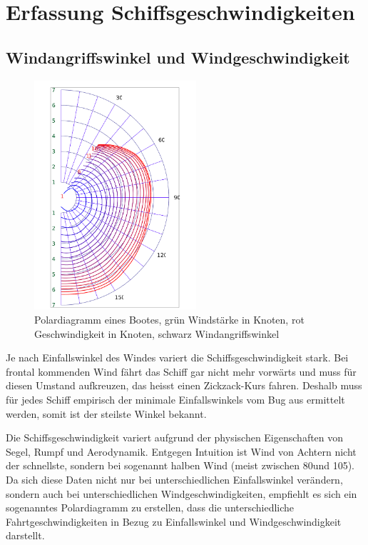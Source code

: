
\section{Erfassung Schiffsgeschwindigkeiten}

\subsection{Windangriffswinkel und Windgeschwindigkeit}

\begin{figure} 
\centering
\includegraphics[width=6cm]{img/polardiagramm}
\caption{Polardiagramm eines Bootes, grün Windstärke in Knoten, rot
Geschwindigkeit in Knoten, schwarz Windangriffswinkel}
\label{polardiagram}
\end{figure}

Je nach Einfallswinkel des Windes variert die Schiffsgeschwindigkeit
stark. Bei frontal kommenden Wind fährt das Schiff gar nicht mehr
vorwärts und muss für diesen Umstand aufkreuzen, das heisst einen
Zickzack-Kurs fahren. Deshalb muss für jedes Schiff empirisch der
minimale Einfallswinkels vom Bug aus ermittelt werden, somit ist der
steilste Winkel bekannt.

Die Schiffsgeschwindigkeit variert aufgrund der physischen Eigenschaften
von Segel, Rumpf und Aerodynamik. Entgegen Intuition ist Wind von
Achtern nicht der schnellste, sondern bei sogenannt halben Wind (meist
zwischen 80\degree und 105\degree). Da sich diese Daten nicht nur bei
unterschiedlichen Einfallswinkel verändern, sondern auch bei
unterschiedlichen Windgeschwindigkeiten, empfiehlt es sich ein
sogenanntes Polardiagramm zu erstellen, dass die unterschiedliche
Fahrtgeschwindigkeiten in Bezug zu Einfallswinkel und
Windgeschwindigkeit darstellt.

